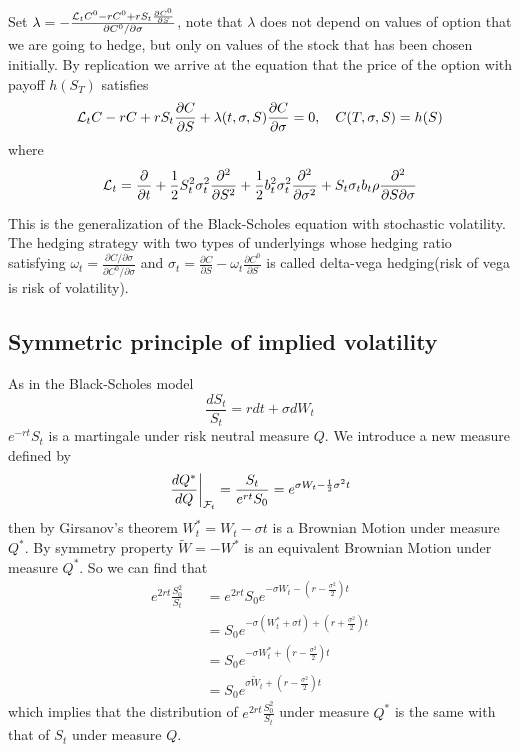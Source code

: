 \documentclass[10pt]{article}
\theoremstyle{plain}
\numberwithin{equation}{section}
\numberwithin{table}{section}
\newcommand{\s}{\sigma}
\newcommand{\om}{\omega}
\newcommand{\pa}{\partial}
\begin{document}
Set $\lambda = - \frac{{\cal{L}}_t C^0 - rC^0 + rS_t \frac{\pa C^0}{\pa S}}{\pa C^0 / \pa \s}$, note that $\lambda$ does not depend on values of option that we are going to hedge, but 
only on values of the stock that has been chosen initially. By replication we arrive at the equation that the price of the option with payoff $h(S_T)$ satisfies
\[
    {\cal{L}}_tC - rC + rS_t \frac{\pa C}{\pa S} + \lambda(t, \s, S) \frac{\pa C}{\pa \s}= 0, \quad C(T, \s, S) = h(S)    
\] 
where 
\[
    {\cal{L}}_t = \frac{\pa}{\pa t} + \frac{1}{2} S_t^2 \s_t^2 \frac{\pa^2}{\pa S^2} + \frac{1}{2} b_t^2 \s_t^2 \frac{\pa^2}{\pa \s^2} + S_t\s_t b_t\rho \frac{\pa^2}{\pa S \pa \s}   
\]

This is the generalization of the Black-Scholes equation with stochastic volatility. The hedging strategy with two types of underlyings whose hedging ratio satisfying $\om_t = \frac{\pa C / \pa \s}{\pa C^0 / \pa \s}$ and 
$\s_t = \frac{\pa C}{\pa S} - \om_t \frac{\pa C^0}{\pa S}$ is called delta-vega hedging(risk of vega is risk of volatility).


\subsection{Symmetric principle of implied volatility}
As in the Black-Scholes model 
\[
    \frac{dS_t}{S_t} = rdt + \s dW_t   
\]
$e^{-rt}S_t$ is a martingale under risk neutral measure $Q$. We introduce a new measure defined by
\[
    \left.\frac{dQ^*}{dQ}\right|_{{\cal F}_t} = \frac{S_t}{e^{rt}S_0}=e^{\s W_t - \frac{1}{2}\s^2 t}
\]
then by Girsanov's theorem $W^*_t = W_t - \s t$ is a Brownian Motion under measure $Q^*$. By symmetry property $\tilde{W}=-W^*$ is an equivalent Brownian Motion
under measure $Q^*$. So we can find that 
\begin{eqnarray*}
    e^{2rt}\frac{S^2_0}{S_t} &&= e^{2rt}S_0 e^{-\s W_t - (r-\frac{\s^2}{2})t} \\
    && = S_0 e^{-\s (W^*_t + \s t) + (r+\frac{\s^2}{2})t}\\
    && = S_0  e^{-\s W^*_t +(r-\frac{\s^2}{2})t} \\
    && = S_0  e^{\s \tilde{W}_t +(r-\frac{\s^2}{2})t}
\end{eqnarray*} 
which implies that the distribution of $e^{2rt}\frac{S^2_0}{S_t}$ under measure $Q^*$ is the same with that of $S_t$ under measure 
$Q$. 
\end{document}
